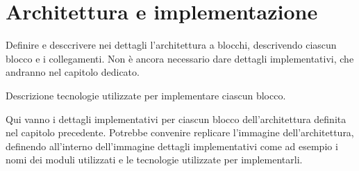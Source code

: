 \chapter{Architettura e implementazione}
\label{sec:implementazione}

Definire e desccrivere nei dettagli l'architettura a blocchi, descrivendo ciascun blocco e i collegamenti.
Non è ancora necessario dare dettagli implementativi, che andranno nel capitolo dedicato.

Descrizione tecnologie utilizzate per implementare ciascun blocco.

Qui vanno i dettagli implementativi per ciascun blocco dell'architettura definita nel capitolo precedente.
Potrebbe convenire replicare l'immagine dell'architettura, definendo all'interno dell'immagine dettagli implementativi come ad esempio i nomi dei moduli utilizzati e le tecnologie utilizzate per implementarli.
